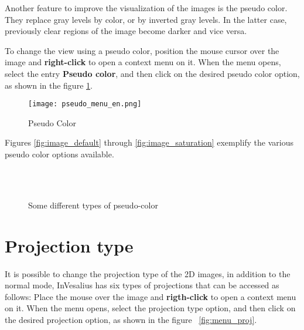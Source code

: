 Another feature to improve the visualization of the images is the pseudo color. They replace gray levels by color, or by inverted gray levels. In the latter case, previously clear regions of the image become darker and vice versa.

To change the view using a pseudo color, position the mouse cursor over the image and \textbf{right-click} to open a context menu on it. When the menu opens, select the entry \textbf{Pseudo color}, and then click on the desired pseudo color option, as shown in the figure \ref{fig:pseudo_color}.

\begin{figure}[p]
\centering
\texttt{[image: pseudo\_menu\_en.png]}
\caption{Pseudo Color}
\label{fig:pseudo_color}
\end{figure}

Figures \ref{fig:image_default} through \ref{fig:image_saturation} exemplify the various pseudo color options available.

\begin{figure}[h]
  \centering
   \qquad
   \qquad
   \\
   \qquad
   \qquad
  \\
  \caption{Some different types of pseudo-color}
  \label{fig:pseudo_color_types}
\end{figure}

\newpage
\section{Projection type}

It is possible to change the projection type of the 2D images, in addition to the normal mode, InVesalius has six types of projections that can be accessed as follows: Place the mouse over the image and \textbf{rigth-click} to open a context menu on it. When the menu opens, select the projection type option, and then click on the desired projection option, as shown in the figure ~\ref{fig:menu_proj}.

